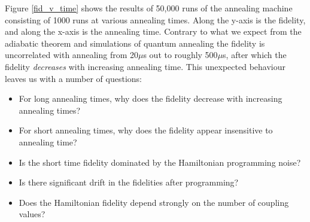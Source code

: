 \documentclass[12pt]{dalthesis}
\begin{document}
Figure \ref{fid_v_time} shows the results of 50,000 runs of the annealing machine consisting of 1000 runs at various annealing times.  Along the y-axis is the fidelity, and along the x-axis is the annealing time.  Contrary to what we expect from the adiabatic theorem and simulations of quantum annealing the fidelity is uncorrelated with annealing from 20$\mu$s out to roughly 500$ \mu$s, after which the fidelity \emph{decreases} with increasing annealing time.  This unexpected behaviour leaves us with a number of questions:

\begin{itemize}
	\item For long annealing times, why does the fidelity decrease with increasing annealing times?
	\item For short annealing times, why does the fidelity appear insensitive to annealing time?
	\item Is the short time fidelity dominated by the Hamiltonian programming noise?
	\item Is there significant drift in the fidelities after programming?
	\item Does the Hamiltonian fidelity depend strongly on the number of coupling values?
\end{itemize}



\end{document}
